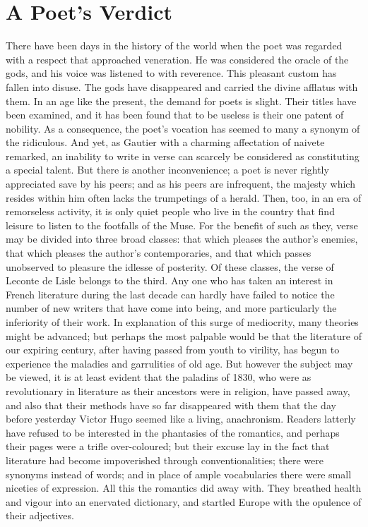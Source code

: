 \documentclass[]{book}
\begin{document}
\chapter{A Poet's Verdict}\label{a-poets-verdict}

There have been days in the history of the world when the poet was
regarded with a respect that approached veneration. He was considered
the oracle of the gods, and his voice was listened to with reverence.
This pleasant custom has fallen into disuse. The gods have disappeared
and carried the divine afflatus with them. In an age like the present,
the demand for poets is slight. Their titles have been examined, and it
has been found that to be useless is their one patent of nobility. As a
consequence, the poet's vocation has seemed to many a synonym of the
ridiculous. And yet, as Gautier with a charming affectation of naivete
remarked, an inability to write in verse can scarcely be considered as
constituting a special talent. But there is another inconvenience; a
poet is never rightly appreciated save by his peers; and as his peers
are infrequent, the majesty which resides within him often lacks the
trumpetings of a herald. Then, too, in an era of remorseless activity,
it is only quiet people who live in the country that find leisure to
listen to the footfalls of the Muse. For the benefit of such as they,
verse may be divided into three broad classes: that which pleases the
author's enemies, that which pleases the author's contemporaries, and
that which passes unobserved to pleasure the idlesse of posterity. Of
these classes, the verse of Leconte de Lisle belongs to the third. Any
one who has taken an interest in French literature during the last
decade can hardly have failed to notice the number of new writers that
have come into being, and more particularly the inferiority of their
work. In explanation of this surge of mediocrity, many theories might be
advanced; but perhaps the most palpable would be that the literature of
our expiring century, after having passed from youth to virility, has
begun to experience the maladies and garrulities of old age. But however
the subject may be viewed, it is at least evident that the paladins of
1830, who were as revolutionary in literature as their ancestors were in
religion, have passed away, and also that their methods have so far
disappeared with them that the day before yesterday Victor Hugo seemed
like a living, anachronism. Readers latterly have refused to be
interested in the phantasies of the romantics, and perhaps their pages
were a trifle over-coloured; but their excuse lay in the fact that
literature had become impoverished through conventionalities; there were
synonyms instead of words; and in place of ample vocabularies there were
small niceties of expression. All this the romantics did away with. They
breathed health and vigour into an enervated dictionary, and startled
Europe with the opulence of their adjectives.
\end{document}
